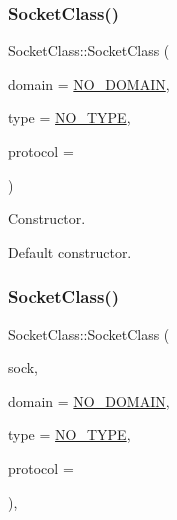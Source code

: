 \subsubsection{\texorpdfstring{Socket\+Class()}{SocketClass()}\hspace{0.1cm}{\footnotesize\ttfamily [1/2]}}
{\footnotesize\ttfamily Socket\+Class\+::\+Socket\+Class (\begin{DoxyParamCaption}\item[{\hyperlink{classSocketClass_ac940413abaa7328db8518a9f121babb6}{Sock\+Domain}}]{domain = {\ttfamily \hyperlink{classSocketClass_ac940413abaa7328db8518a9f121babb6aa9ec2a4d642c47813fe90f362603f1c4}{N\+O\+\_\+\+D\+O\+M\+A\+IN}},  }\item[{\hyperlink{classSocketClass_a2182dd9fee09459fabb99e6ae717f595}{Sock\+Type}}]{type = {\ttfamily \hyperlink{classSocketClass_a2182dd9fee09459fabb99e6ae717f595a8c7f955ea5b71498ff1d469345d813ad}{N\+O\+\_\+\+T\+Y\+PE}},  }\item[{int}]{protocol = {} }\end{DoxyParamCaption})\hspace{0.3cm}{\ttfamily [inline]}}

Constructor.

Default constructor. \mbox{\label{classSocketClass_ac291e571738e1778010c2fd1731eb659}} 
\subsubsection{\texorpdfstring{Socket\+Class()}{SocketClass()}\hspace{0.1cm}{\footnotesize\ttfamily [2/2]}}
{\footnotesize\ttfamily Socket\+Class\+::\+Socket\+Class (\begin{DoxyParamCaption}\item[{int}]{sock,  }\item[{\hyperlink{classSocketClass_ac940413abaa7328db8518a9f121babb6}{Sock\+Domain}}]{domain = {\ttfamily \hyperlink{classSocketClass_ac940413abaa7328db8518a9f121babb6aa9ec2a4d642c47813fe90f362603f1c4}{N\+O\+\_\+\+D\+O\+M\+A\+IN}},  }\item[{\hyperlink{classSocketClass_a2182dd9fee09459fabb99e6ae717f595}{Sock\+Type}}]{type = {\ttfamily \hyperlink{classSocketClass_a2182dd9fee09459fabb99e6ae717f595a8c7f955ea5b71498ff1d469345d813ad}{N\+O\+\_\+\+T\+Y\+PE}},  }\item[{int}]{protocol = {} }\end{DoxyParamCaption})\hspace{0.3cm}{\ttfamily [inline]}, {\ttfamily [protected]}}

